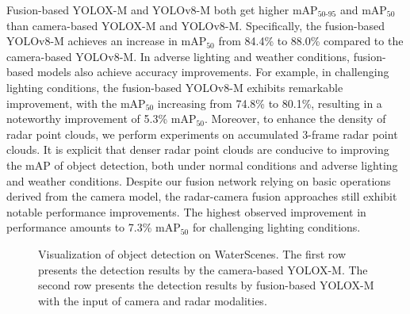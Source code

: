 \documentclass[lettersize,journal]{IEEEtran}
\begin{document}
Fusion-based YOLOX-M and YOLOv8-M both get higher mAP$_{50\text{-}95}$ and mAP$_{50}$ than camera-based YOLOX-M and YOLOv8-M. Specifically, the fusion-based YOLOv8-M achieves an increase in mAP$_{50}$ from 84.4\% to 88.0\% compared to the camera-based YOLOv8-M. 
In adverse lighting and weather conditions, fusion-based models also achieve accuracy improvements. For example, in challenging lighting conditions, the fusion-based YOLOv8-M exhibits remarkable improvement, with the mAP$_{50}$ increasing from 74.8\% to 80.1\%, resulting in a noteworthy improvement of 5.3\% mAP$_{50}$.
Moreover, to enhance the density of radar point clouds, we perform experiments on accumulated 3-frame radar point clouds. It is explicit that denser radar point clouds are conducive to improving the mAP of object detection, both under normal conditions and adverse lighting and weather conditions. Despite our fusion network relying on basic operations derived from the camera model, the radar-camera fusion approaches still exhibit notable performance improvements. The highest observed improvement in performance amounts to 7.3\% mAP$_{50}$ for challenging lighting conditions.


\begin{figure}[htbp]
\centering
{}
\quad
\hspace{-6.6mm}
\quad
\hspace{-6.6mm}
\vspace{-2mm}
\centering
{}
\quad
\hspace{-6.6mm}
\quad
\hspace{-6.6mm}
\caption{Visualization of object detection on WaterScenes. The first row presents the detection results by the camera-based YOLOX-M. The second row presents the detection results by fusion-based YOLOX-M with the input of camera and radar modalities.}
\label{fig:object-detection-figures}
\end{figure}
\end{document}
